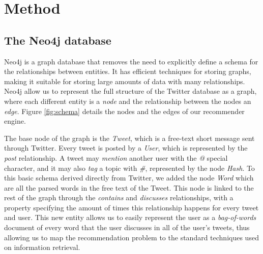 \section{Method}
\label{sec:method}



\subsection{The Neo4j database}

Neo4j is a graph database that removes the need to explicitly define a schema
for the relationships between entities. It has efficient techniques for storing
graphs, making it suitable for storing large amounts of data with many
relationships. Neo4j allow us to represent the full structure of the Twitter
database as a graph, where each different entity is a \emph{node} and the
relationship between the nodes an \emph{edge}. Figure \ref{fig:schema} details
the nodes and the edges of our recommender engine.



The base node of the graph is the \emph{Tweet}, which is a free-text short
message sent through Twitter. Every tweet is posted by a \emph{User}, which is
represented by the \emph{post} relationship. A tweet may \emph{mention} another
user with the \emph{@} special character, and it may also \emph{tag} a topic
with \emph{\#}, represented by the node \emph{Hash}. To this basic schema
derived directly from Twitter, we added the node \emph{Word} which are all the
parsed words in the free text of the Tweet. This node is linked to the rest of
the graph through the \emph{contains} and \emph{discusses} relationships, with a
property specifying the amount of times this relationship happens for every
tweet and user. This new entity allows us to easily represent the user as a
\emph{bag-of-words} document of every word that the user discusses in all of the
user's tweets, thus allowing us to map the recommendation problem to the
standard techniques used on information retrieval.

